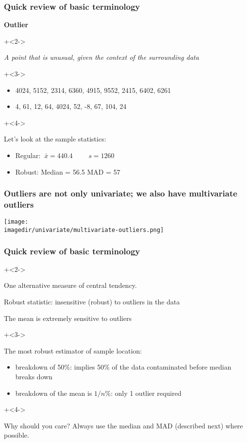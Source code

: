 \begin{frame}\frametitle{Quick review of basic terminology}
	{\color{purple} \textbf{Outlier}}
	\vspace{1cm}
	
	\onslide+<2->{
		\begin{exampleblock}{}
			\begin{center}
				\emph{A point that is unusual, given the context of the surrounding data}
			\end{center}
		\end{exampleblock}
	}
	\onslide+<3->{
		\begin{itemize}
			\item	4024, 5152, 2314, 6360, 4915, 9552, 2415, 6402, 6261
			\item	4, 61, 12, 64, 4024, 52, -8, 67, 104, 24
		\end{itemize}
	}
	\onslide+<4->{
		\vspace{12pt}
		Let's look at the sample statistics:
		
		\begin{itemize}
			\item	{\color{myOrange}Regular:} \qquad$~\bar{x} = 440.4$ ~~~~\qquad $s = 1260$
			\item	{\color{myOrange}Robust:}  Median = 56.5 \qquad MAD = 57
		\end{itemize}
	}
\end{frame}

\begin{frame}\frametitle{Outliers are not only univariate; we also have multivariate outliers}
	\centerline{\texttt{[image: \\imagedir/univariate/multivariate-outliers.png]}}
\end{frame}

\begin{frame}\frametitle{Quick review of basic terminology}
	{}
		
	\begin{itemize}
		\onslide+<2->{
			\item	One alternative measure of central tendency.
			\item	Robust statistic: insensitive (robust) to outliers in the data
			\item	The mean is extremely sensitive to outliers
		}
		\onslide+<3->{
			\item	The most robust estimator of sample location:
			\begin{itemize}
				\item	breakdown of 50\%: implies 50\% of the data contaminated before median breaks down
				\item	breakdown of the mean is $1/n$\%:  only 1 outlier required
			\end{itemize}
		}
	\end{itemize}
	\onslide+<4->{
		\begin{exampleblock}{Why should you care?}
			Always use the median and MAD (described next) where possible.
		\end{exampleblock}
	}
\end{frame}

